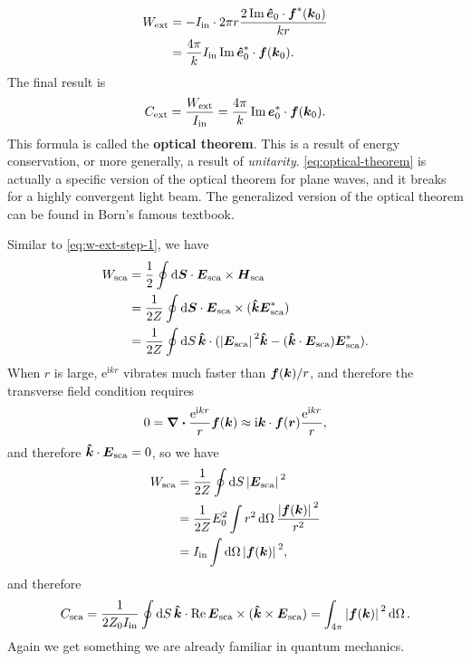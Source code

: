 \documentclass[hyperref, a4paper]{article}
\newcommand*{\ii}{\mathrm{i}}
\newcommand*{\ee}{\mathrm{e}}
\newcommand*{\concept}[1]{{\textbf{#1}}}
\begin{document}
\[
    \begin{aligned}
        W_\text{ext} &= - I_\text{in} \cdot 2 \pi r \frac{2 \Im \vu*{e}_0 \cdot \vb*{f}^*(\vb*{k}_0)}{k r} \\
        &= \frac{4 \pi }{k} I_\text{in} \Im \vu*{e}^*_0 \cdot \vb*{f}(\vb*{k}_0).
    \end{aligned}
\]
The final result is 
\begin{equation}
    C_\text{ext} = \frac{W_\text{ext}}{I_\text{in}} = \frac{4 \pi}{k} \Im \vb*{e}_0^* \cdot \vb*{f}(\vb*{k}_0).
    \label{eq:optical-theorem}
\end{equation}
This formula is called the \concept{optical theorem}. This is a result of energy conservation, or 
more generally, a result of \emph{unitarity}. 
\eqref{eq:optical-theorem} is actually a specific version of the optical theorem for plane waves, 
and it breaks for a highly convergent light beam. The generalized version of the optical theorem 
can be found in Born's famous textbook.

Similar to \eqref{eq:w-ext-step-1}, we have 
\[
    \begin{aligned}
        W_\text{sca} &= \frac{1}{2} \oint \dd{\vb*{S}} \cdot \vb*{E}_\text{sca} \times \vb*{H}_\text{sca} \\
        &= \frac{1}{2 Z} \oint \dd{\vb*{S}} \cdot \vb*{E}_\text{sca} \times (\vu*{k} \vb*{E}^*_\text{sca}) \\
        &= \frac{1}{2 Z} \oint \dd{S} \vu*{k} \cdot (\abs*{\vb*{E}_\text{sca}}^2 \vu*{k} - (\vu*{k} \cdot \vb*{E}_\text{sca}) \vb*{E}^*_\text{sca}).
    \end{aligned}
\]
When $r$ is large, $\ee^{\ii k r}$ vibrates much faster than $\vb*{f}(\vb*{k}) / r$, and therefore the transverse field condition requires
\[
    0 = \div{\frac{\ee^{\ii k r}}{r} \vb*{f}(\vb*{k})} \approx \ii \vb*{k} \cdot \vb*{f}(\vb*{r}) \frac{\ee^{\ii k r}}{r},
\]
and therefore $\vu*{k} \cdot \vb*{E}_\text{sca} = 0$, so we have 
\[
    \begin{aligned}
        W_\text{sca} &= \frac{1}{2Z} \oint \dd{S} \abs*{\vb*{E}_\text{sca}}^2 \\
        &= \frac{1}{2Z} E_0^2 \int r^2 \dd{\Omega} \frac{\abs*{\vb*{f}(\vb*{k})}^2}{r^2} \\
        &= I_\text{in} \int \dd{\Omega} \abs*{\vb*{f}(\vb*{k})}^2,
    \end{aligned}
\]
and therefore 
\begin{equation}
    C_\text{sca} = \frac{1}{2 Z_0 I_\text{in}} \oint \dd{S} \vu*{k} \cdot \Re \vb*{E}_\text{sca} \times (\vu*{k} \times \vb*{E}_\text{sca}) = \int_{4\pi} \abs*{\vb*{f}(\vb*{k})}^2 \dd{\Omega}.
\end{equation}
Again we get something we are already familiar in quantum mechanics. 
\end{document}
